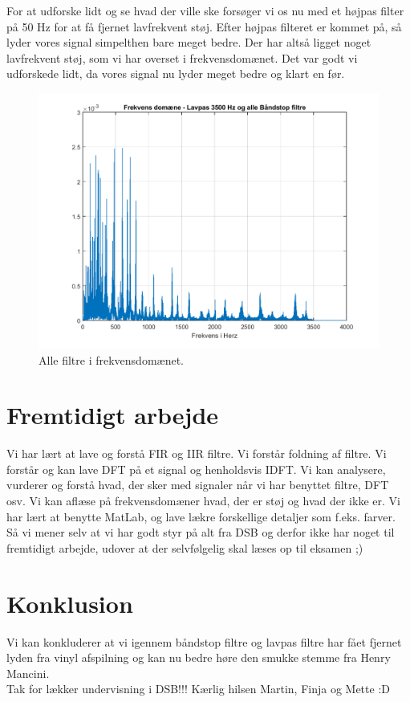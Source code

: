 \documentclass[12pt, letterpaper]{article}
\begin{document}
\newpage
For at udforske lidt og se hvad der ville ske forsøger vi os nu med et højpas filter på 50 Hz for at få fjernet lavfrekvent støj. Efter højpas filteret er kommet på, så lyder vores signal simpelthen bare meget bedre. Der har altså ligget noget lavfrekvent støj, som vi har overset i frekvensdomænet. Det var godt vi udforskede lidt, da vores signal nu lyder meget bedre og klart en før. 
\begin{figure}[H]
           \includegraphics[width=\linewidth]{billeder/VinylHP50}	   							\caption{Alle filtre i frekvensdomænet.}
\end{figure}

\newpage
\section{Fremtidigt arbejde}
Vi har lært at lave og forstå FIR og IIR filtre. Vi forstår foldning af filtre. Vi forstår og kan lave DFT på et signal og henholdsvis IDFT. 
Vi kan analysere, vurderer og forstå hvad, der sker med signaler når vi har benyttet filtre, DFT osv. Vi kan aflæse på frekvensdomæner hvad, der er støj og hvad der ikke er. 
Vi har lært at benytte MatLab, og lave lækre forskellige detaljer som f.eks. farver. 
Så vi mener selv at vi har godt styr på alt fra DSB og derfor ikke har noget til fremtidigt arbejde, udover at der selvfølgelig skal læses op til eksamen ;)


\section{Konklusion}
Vi kan konkluderer at vi igennem båndstop filtre og lavpas filtre har fået fjernet lyden fra vinyl afspilning og kan nu bedre høre den smukke stemme fra Henry Mancini. \\ 

Tak for lækker undervisning i DSB!!! Kærlig hilsen Martin, Finja og Mette :D 
\end{document}

